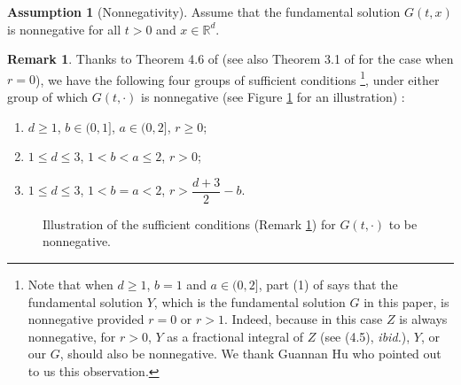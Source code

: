 \documentclass[a4paper,11pt]{article}
\numberwithin{equation}{section}
\numberwithin{equation}{section}
\theoremstyle{plain}
\theoremstyle{definition}
\newtheorem{assumption}[theorem]{Assumption}
\newtheorem{remark}[theorem]{Remark}
\newcommand{\R}{\mathbb{R}}
\begin{document}
\begin{assumption}[Nonnegativity] \label{A:Nonnegative}
  Assume that the fundamental solution $G(t,x)$ is nonnegative for all $t>0$ and $x\in\R^d$.
\end{assumption}

\begin{remark} \label{R:Nonnegative}
  Thanks to Theorem 4.6 of \cite{CHN19} (see also Theorem 3.1 of \cite{CHHH17} for the case when $r=0$),
  we have the following four groups of sufficient conditions \footnote{Note that when $d\ge 1$,
    $b=1$ and $a\in (0,2]$, part (1) of \cite[Theorem 4.6]{CHN19} says that the fundamental solution
    $Y$, which is the fundamental solution $G$ in this paper, is nonnegative provided $r=0$ or
  $r>1$. Indeed, because in this case $Z$ is always nonnegative, for $r>0$, $Y$ as a fractional
  integral of $Z$ (see (4.5), {\it ibid.}),  $Y$, or our $G$, should also be nonnegative. We thank
  Guannan Hu who pointed out to us this observation.}, under either group of which $G(t,\cdot)$ is
  nonnegative (see Figure \ref{F:Nonnegative} for an illustration) :
  \begin{enumerate}
    \item $d \ge 1$, $b\in(0,1]$, $a\in(0,2]$, $r\ge0$;
    \item $1\le d \le 3$, $1<b<a\le 2$, $r>0$;
    \item $1 \le d \le 3$, $1 < b=a < 2$, $r > \dfrac{d+3}{2}-b$.
  \end{enumerate}
\end{remark}

\begin{figure}[htpb]
  \centering
  \caption{Illustration of the sufficient conditions (Remark \ref{R:Nonnegative}) for
    $G(t,\cdot)$ to be nonnegative.}
  \label{F:Nonnegative}
\end{figure}
\end{document}

